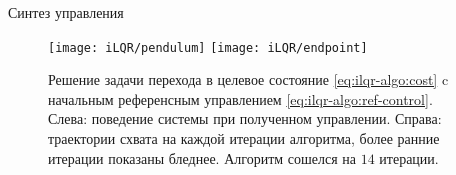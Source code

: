 \documentclass[../../doc.tex]{subfiles}
\begin{document}
    \begin{rusalgorithm}\caption{Синтез управления}\label{alg:Sinthesis}
        \DontPrintSemicolon
    \end{rusalgorithm}

    \begin{figure}[h]
        \begin{center}
            \texttt{[image: iLQR/pendulum]}
            \texttt{[image: iLQR/endpoint]}
        \end{center}
        \caption{
            Решение задачи перехода в целевое состояние \eqref{eq:ilqr-algo:cost} c начальным референсным управлением \eqref{eq:ilqr-algo:ref-control}.
            Слева: поведение системы при полученном управлении. Справа: траектории схвата на каждой итерации алгоритма, более ранние итерации показаны бледнее.
            Алгоритм сошелся на $14$ итерации.
        }
    \end{figure}

    \ifSubfilesClassLoaded{
        \nocite{*}
        \clearpage
        
        
    }{}
\end{document}
